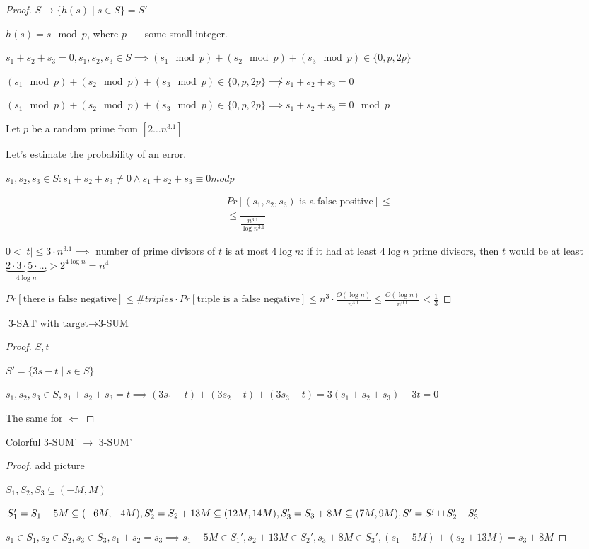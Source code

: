 \begin{proof}
	$S \to \{h(s) \mid s \in S\} = S'$ 

	$h(s) = s \mod p$, where $p$~--- some small integer. 

	$s_1 + s_2 + s_3 = 0, s_1, s_2, s_3 \in S \implies (s_1 \mod p) + (s_2 \mod p) + (s_3 \mod p) \in \{0, p, 2p\}$

	$(s_1 \mod p) + (s_2 \mod p) + (s_3 \mod p) \in \{0, p, 2p\} \not\implies s_1 + s_2 + s_3 = 0$ 

	
	$(s_1 \mod p) + (s_2 \mod p) + (s_3 \mod p) \in \{0, p, 2p\} \implies s_1 + s_2 + s_3 \equiv 0 \mod p$ 
	
	Let $p$ be a random prime from $[2 \ldots n^{3.1}]$ 


	Let's estimate the probability of an error.

	$s_1, s_2, s_3 \in S: s_1 + s_2 + s_3 \ne 0 \land s_1 + s_2 + s_3 \equiv 0 mod p$ 

	\begin{align*}
	Pr[(s_1, s_2, s_3) \text{ is a false positive}] \le \\
	\le \dfrac{}{\frac{n^{3.1}}{\log n^{3.1}}}
	\end{align*}

	$0 < |t| \le 3 \cdot n^{3.1} \implies $ number of prime divisors of $t $ is at most $4 \log n$: if it had at least $4 \log n$ prime divisors, then $t $ would be at least $\underbrace{2 \cdot 3 \cdot 5 \cdot \ldots}_{4\log n} > 2 ^{4 \log n} = n^4$   

	$Pr[\text{there is false negative}] \le \#triples \cdot Pr[\text{triple is a false negative}] \le n^3 \cdot \frac{O(\log n)}{n^{3.1}} \le \frac{O(\log n)}{n^{0.1}} < \frac{1}{3}$ 
\end{proof}

\begin{lm}
	$\text{3-SAT with target} \to \text{3-SUM}$ 
\end{lm}

\begin{proof}
	$S, t$ 

	$S' = \{3s - t \mid s \in S\}$ 

	$s_1, s_2, s_3 \in S, s_1 + s_2 + s_3 = t \implies (3s_1 - t) + (3s_2 - t) + (3s_3 - t) = 3(s_1 + s_2 + s_3) - 3t = 0$ 

	The same for $\Leftarrow$ 
\end{proof}

\begin{lm}
	Colorful 3-SUM' $\to $ 3-SUM'
\end{lm}

\begin{proof}
	{\color{red} add picture}

	$S_1, S_2, S_3 \subseteq (-M, M)$ 

	$S_1' = S_1 - 5M \subseteq (-6M, -4M), \\
	S_2' = S_2 + 13M \subseteq (12M, 14M), \\
	S_3' = S_3 + 8M \subseteq (7M, 9M),\\
	S' = S_1' \sqcup S_2' \sqcup S_3'$ 

	$s_1 \in S_1, s_2 \in S_2, s_3 \in S_3, s_1 + s_2 = s_3 \implies s_1 - 5M \in S_1', s_2 + 13M \in S_2', s_3 + 8M \in S_3', (s_1 - 5M) + (s_2 + 13M) = s_3 + 8M$ 
\end{proof}
